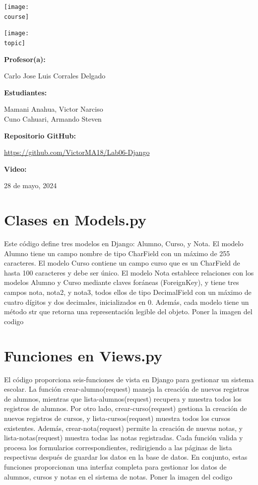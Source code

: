 \documentclass[10pt, a4paper]{article}
\newcommand{\course}{img/web_programming}
\newcommand{\topic}{img/Django.jpg}
\newcommand{\professor}{Carlo Jose Luis Corrales Delgado}
\newcommand{\students}{Mamani Anahua, Victor Narciso \\ Cuno Cahuari, Armando Steven}
\newcommand{\github}{https://github.com/VictorMA18/Lab06-Django}
\newcommand{\video}{}
\newcommand{\mydate}{28 de mayo, 2024}
\begin{document}
\begin{titlepage}
	\centering
	\texttt{[image: \\course]} \par
  \vfill \vfill
	\texttt{[image: \\topic]}\par
  \vfill \vfill
  {\textbf{Profesor(a):} \par}
	\professor \vfill
  {\textbf{Estudiantes:} \par}
	\students \vfill
  {\textbf{Repositorio GitHub:} \par}
  \href{\github}{\github} \vfill
  {\textbf{Video:} \par}
  \href{\video}{\video} \vfill
	{\large \mydate \par}
\end{titlepage}

\section{Clases en Models.py}
Este código define tres modelos en Django: Alumno, Curso, y Nota. El modelo Alumno tiene un campo nombre de tipo CharField con un máximo de 255 caracteres. El modelo Curso contiene un campo curso que es un CharField de hasta 100 caracteres y debe ser único. El modelo Nota establece relaciones con los modelos Alumno y Curso mediante claves foráneas (ForeignKey), y tiene tres campos nota, nota2, y nota3, todos ellos de tipo DecimalField con un máximo de cuatro dígitos y dos decimales, inicializados en 0. Además, cada modelo tiene un método str que retorna una representación legible del objeto.
\singlespacing
Poner la imagen del codigo 

\section{Funciones en Views.py}
El código proporciona seis-funciones de vista en Django para gestionar un sistema escolar. La función crear-alumno(request) maneja la creación de nuevos registros de alumnos, mientras que lista-alumnos(request) recupera y muestra todos los registros de alumnos. Por otro lado, crear-curso(request) gestiona la creación de nuevos registros de cursos, y lista-cursos(request) muestra todos los cursos existentes. Además, crear-nota(request) permite la creación de nuevas notas, y lista-notas(request) muestra todas las notas registradas. Cada función valida y procesa los formularios correspondientes, redirigiendo a las páginas de lista respectivas después de guardar los datos en la base de datos. En conjunto, estas funciones proporcionan una interfaz completa para gestionar los datos de alumnos, cursos y notas en el sistema de notas.
\singlespacing
Poner la imagen del codigo 
\end{document}
